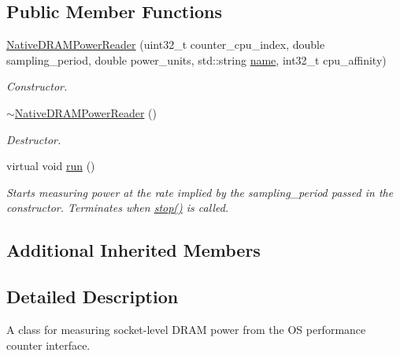 \subsection*{Public Member Functions}
\begin{DoxyCompactItemize}
\item 
\hyperlink{classxmem_1_1power_1_1_native_d_r_a_m_power_reader_a825b2e2e2a92c1c31f7e252bb5402e32}{Native\+D\+R\+A\+M\+Power\+Reader} (uint32\+\_\+t counter\+\_\+cpu\+\_\+index, double sampling\+\_\+period, double power\+\_\+units, std\+::string \hyperlink{classxmem_1_1power_1_1_power_reader_ac0f465b044512502eb1824f18d60e3e6}{name}, int32\+\_\+t cpu\+\_\+affinity)
\begin{DoxyCompactList}\small\item\em Constructor. \end{DoxyCompactList}\item 
\hypertarget{classxmem_1_1power_1_1_native_d_r_a_m_power_reader_a7b6049c41515c227cd23c815d60edb43}{}\hyperlink{classxmem_1_1power_1_1_native_d_r_a_m_power_reader_a7b6049c41515c227cd23c815d60edb43}{$\sim$\+Native\+D\+R\+A\+M\+Power\+Reader} ()\label{classxmem_1_1power_1_1_native_d_r_a_m_power_reader_a7b6049c41515c227cd23c815d60edb43}

\begin{DoxyCompactList}\small\item\em Destructor. \end{DoxyCompactList}\item 
\hypertarget{classxmem_1_1power_1_1_native_d_r_a_m_power_reader_acf3e518e39c8b90f759c674a2c81d985}{}virtual void \hyperlink{classxmem_1_1power_1_1_native_d_r_a_m_power_reader_acf3e518e39c8b90f759c674a2c81d985}{run} ()\label{classxmem_1_1power_1_1_native_d_r_a_m_power_reader_acf3e518e39c8b90f759c674a2c81d985}

\begin{DoxyCompactList}\small\item\em Starts measuring power at the rate implied by the sampling\+\_\+period passed in the constructor. Terminates when \hyperlink{classxmem_1_1power_1_1_power_reader_a5c28efc4aece34a5469d067a133920f4}{stop()} is called. \end{DoxyCompactList}\end{DoxyCompactItemize}
\subsection*{Additional Inherited Members}


\subsection{Detailed Description}
A class for measuring socket-\/level D\+R\+A\+M power from the O\+S performance counter interface. 

